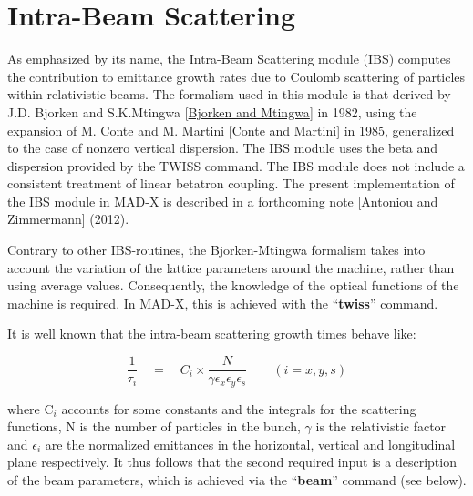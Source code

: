 

\chapter{Intra-Beam Scattering}

 As emphasized by its name, the Intra-Beam Scattering module (IBS)
 computes the  contribution to emittance growth rates due to Coulomb
 scattering of particles within relativistic beams. The formalism used
 in this module is that derived by J.D. Bjorken and S.K.Mtingwa
 [\href{../Introduction/bibliography.html#bm1}{Bjorken and Mtingwa}] in
 1982, using the expansion of M. Conte and M. Martini
 [\href{../Introduction/bibliography.html#conte}{Conte and Martini}] in
 1985,  generalized to the case of nonzero vertical dispersion.  The IBS
 module uses the beta and dispersion provided by the TWISS command.
 The IBS module does not include a consistent treatment of linear
 betatron coupling.  The present implementation of the IBS module in
 MAD-X is described in a forthcoming note  [Antoniou and Zimmermann]
 (2012).   

 Contrary to other IBS-routines, the Bjorken-Mtingwa formalism takes
 into account the variation of the lattice parameters around the
 machine, rather than using average values. Consequently, the knowledge
 of the optical functions of the machine is required. In MAD-X, this is
 achieved with the ``\textbf{twiss}'' command.  

 It is well known that the intra-beam scattering growth times behave
 like:  
 
%  

\[
 \frac{1}{\tau_i} \quad = \quad C_i \times \frac{N}{\gamma \epsilon_x
   \epsilon_y \epsilon_s} \qquad (i = x, y, s) 
\]

where C$_i$ accounts for some constants and the integrals for the
scattering functions, N is the number of particles in the bunch,
$\gamma$ is the relativistic factor and $\epsilon_i$ are the normalized
emittances in the horizontal, vertical and longitudinal plane
respectively. It thus follows that the second required input is a
description of the beam parameters, which is achieved via the
``\textbf{beam}'' command (see below). 

